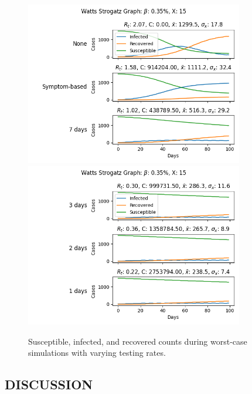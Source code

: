 \documentclass[fullpage]{extarticle}
\begin{document}
\begin{large}
\begin{flushleft}
\begin{figure}
\begin{center}
	\label{fig4}
	\includegraphics[width=0.85\textwidth]{figures/ws/results_worst_none-symp-7}
	\includegraphics[width=0.85\textwidth]{figures/ws/results_worst_3-2-1}
	\caption{Susceptible, infected, and recovered counts during worst-case simulations with varying testing rates.}
\end{center}
\end{figure}

\end{flushleft}
\end{large}

\break

\begin{center}
\section{DISCUSSION}
\label{sec:4}
\end{center}
\end{document}
